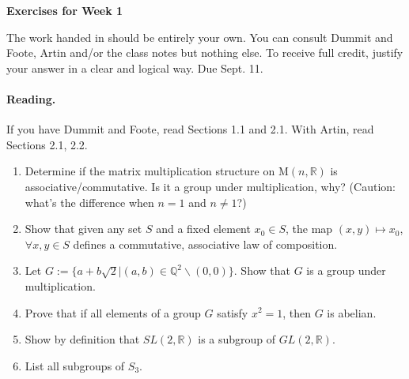 \documentclass[12pt]{article}
\title{}
\date{}
\theoremstyle{plain}
\theoremstyle{definition}
\theoremstyle{remark}
\begin{document}
\begin{center}
{\Large \bf Exercises for Week 1}
\end{center}
The work handed in should be entirely your own. You can consult Dummit and Foote, Artin and/or the class notes but nothing else. To receive full credit, justify your answer in a clear and logical way. Due Sept. 11.

\paragraph{Reading.} If you have Dummit and Foote, read Sections 1.1 and 2.1. With Artin, read Sections 2.1, 2.2.

\begin{enumerate}
\item Determine if the matrix multiplication structure on $\mathrm{M}(n,\mathbb{R})$ is associative/commutative. Is it a group under multiplication, why? (Caution: what's the difference when $n=1$ and $n\neq 1$?)

\item Show that given any set $S$ and a fixed element $x_0\in S$, the map $(x,y)\mapsto x_0$, $\forall x, y \in S$ defines a commutative, associative law of composition.

\item Let $G:=\{a+b\sqrt{2}|(a,b)\in \mathbb{Q}^2\backslash (0,0)\}$. Show that $G$ is a group under multiplication.

\item Prove that if all elements of a group $G$ satisfy $x^2=1$, then $G$ is abelian.

\item Show by definition that $SL(2,\mathbb{R})$ is a subgroup of $GL(2,\mathbb{R})$.

\item List all subgroups of $S_3$.


\end{enumerate}
\end{document}
